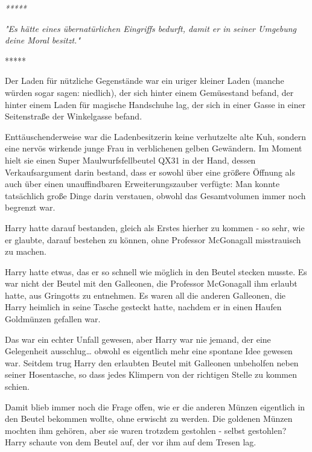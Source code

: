 

\hypertarget{der-fundamentale-attributionsfehler}{%

\emph{*****}

\emph{"Es hätte eines übernatürlichen Eingriffs bedurft, damit er in seiner Umgebung deine Moral besitzt."}

*****

Der Laden für nützliche Gegenstände war ein uriger kleiner Laden (manche würden sogar sagen: niedlich), der sich hinter einem Gemüsestand befand, der hinter einem Laden für magische Handschuhe lag, der sich in einer Gasse in einer Seitenstraße der Winkelgasse befand.

Enttäuschenderweise war die Ladenbesitzerin keine verhutzelte alte Kuh, sondern eine nervös wirkende junge Frau in verblichenen gelben Gewändern. Im Moment hielt sie einen Super Maulwurfsfellbeutel QX31 in der Hand, dessen Verkaufsargument darin bestand, dass er sowohl über eine größere Öffnung als auch über einen unauffindbaren Erweiterungszauber verfügte: Man konnte tatsächlich große Dinge darin verstauen, obwohl das Gesamtvolumen immer noch begrenzt war.

Harry hatte darauf bestanden, gleich als Erstes hierher zu kommen - so sehr, wie er glaubte, darauf bestehen zu können, ohne Professor McGonagall misstrauisch zu machen.

Harry hatte etwas, das er so schnell wie möglich in den Beutel stecken musste. Es war nicht der Beutel mit den Galleonen, die Professor McGonagall ihm erlaubt hatte, aus Gringotts zu entnehmen. Es waren all die anderen Galleonen, die Harry heimlich in seine Tasche gesteckt hatte, nachdem er in einen Haufen Goldmünzen gefallen war.

Das war ein echter Unfall gewesen, aber Harry war nie jemand, der eine Gelegenheit ausschlug… obwohl es eigentlich mehr eine spontane Idee gewesen war. Seitdem trug Harry den erlaubten Beutel mit Galleonen unbeholfen neben seiner Hosentasche, so dass jedes Klimpern von der richtigen Stelle zu kommen schien.

Damit blieb immer noch die Frage offen, wie er die anderen Münzen eigentlich in den Beutel bekommen wollte, ohne erwischt zu werden. Die goldenen Münzen mochten ihm gehören, aber sie waren trotzdem gestohlen - selbst gestohlen? Harry schaute von dem Beutel auf, der vor ihm auf dem Tresen lag.

}
